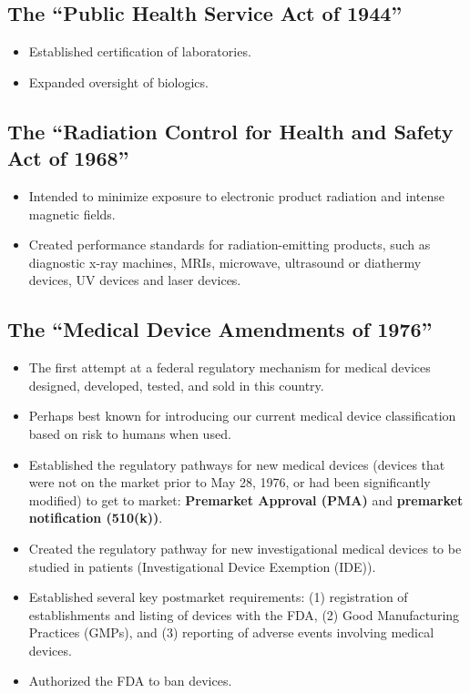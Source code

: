\documentclass[11pt]{book}
\begin{document}
\subsection{The ``Public Health Service Act of 1944''}
\begin{itemize}
	\item Established certification of laboratories.
	\item Expanded oversight of biologics.
\end{itemize}

\subsection{The ``Radiation Control for Health and Safety Act of 1968''}
\begin{itemize}
	\item Intended to minimize exposure to electronic product radiation and intense magnetic fields.
	\item Created performance standards for radiation-emitting products, such as diagnostic x-ray machines, MRIs, microwave, ultrasound or diathermy devices, UV devices and laser devices.
\end{itemize}

\subsection{The ``Medical Device Amendments of 1976''}
\begin{itemize}
	\item The first attempt at a federal regulatory mechanism for medical devices designed, developed, tested, and sold in this country.
	\item Perhaps best known for introducing our current medical device classification based on risk to humans when used.
	\item Established the regulatory pathways for new medical devices (devices that were not on the market prior to May 28, 1976, or had been significantly modified) to get to market: \textbf{Premarket Approval (PMA)} and \textbf{premarket notification (510(k))}.
	\item Created the regulatory pathway for new investigational medical devices to be studied in patients (Investigational Device Exemption (IDE)).
	\item Established several key postmarket requirements: (1) registration of establishments and listing of devices with the FDA, (2) Good Manufacturing Practices (GMPs), and (3) reporting of adverse events involving medical devices.
	\item Authorized the FDA to ban devices.
\end{itemize}
\end{document}
